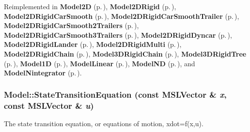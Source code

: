 Reimplemented in {\bf Model2D} {\rm (p.\,\pageref{class_Model2D_a2})}, {\bf Model2DRigid} {\rm (p.\,\pageref{class_Model2DRigid_a6})}, {\bf Model2DRigid\-Car\-Smooth} {\rm (p.\,\pageref{class_Model2DRigidCarSmooth_a5})}, {\bf Model2DRigid\-Car\-Smooth\-Trailer} {\rm (p.\,\pageref{class_Model2DRigidCarSmoothTrailer_a4})}, {\bf Model2DRigid\-Car\-Smooth2Trailers} {\rm (p.\,\pageref{class_Model2DRigidCarSmooth2Trailers_a4})}, {\bf Model2DRigid\-Car\-Smooth3Trailers} {\rm (p.\,\pageref{class_Model2DRigidCarSmooth3Trailers_a4})}, {\bf Model2DRigid\-Dyncar} {\rm (p.\,\pageref{class_Model2DRigidDyncar_a3})}, {\bf Model2DRigid\-Lander} {\rm (p.\,\pageref{class_Model2DRigidLander_a3})}, {\bf Model2DRigid\-Multi} {\rm (p.\,\pageref{class_Model2DRigidMulti_a3})}, {\bf Model2DRigid\-Chain} {\rm (p.\,\pageref{class_Model2DRigidChain_a2})}, {\bf Model3DRigid\-Chain} {\rm (p.\,\pageref{class_Model3DRigidChain_a3})}, {\bf Model3DRigid\-Tree} {\rm (p.\,\pageref{class_Model3DRigidTree_a3})}, {\bf Model1D} {\rm (p.\,\pageref{class_Model1D_a2})}, {\bf Model\-Linear} {\rm (p.\,\pageref{class_ModelLinear_a2})}, {\bf Model\-ND} {\rm (p.\,\pageref{class_ModelND_a2})}, and {\bf Model\-Nintegrator} {\rm (p.\,\pageref{class_ModelNintegrator_a2})}.
\subsubsection{ Model::State\-Transition\-Equation (const {\bf MSLVector} \& {\em x}, const {\bf MSLVector} \& {\em u})\hspace{0.3cm}{\tt  [pure virtual]}}\label{class_Model_a3}


The state transition equation, or equations of motion, xdot=f(x,u).



